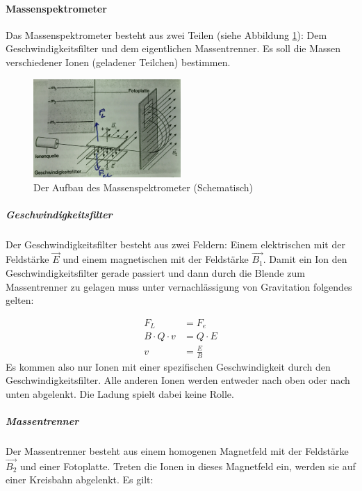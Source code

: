 \documentclass[a4paper]{article}
\begin{document}
		
			
			
			\paragraph{Massenspektrometer}
				Das Massenspektrometer besteht aus zwei Teilen (siehe Abbildung \ref{img:massenspektrometer}): Dem Geschwindigkeitsfilter und dem eigentlichen Massentrenner. Es soll die Massen verschiedener Ionen (geladener Teilchen) bestimmen.
				
				\begin{figure}[ht]
					\centering
					\includegraphics[width=0.5\textwidth]{img/massenspektrometer.jpg}
					\caption{Der Aufbau des Massenspektrometer (Schematisch)}
					\label{img:massenspektrometer}
				\end{figure}
				
				\subparagraph{Geschwindigkeitsfilter} Der Geschwindigkeitsfilter besteht aus zwei Feldern: Einem elektrischen mit der Feldstärke $\vec{E}$ und einem magnetischen mit der Feldstärke $\vec{B_1}$. Damit ein Ion den Geschwindigkeitsfilter gerade passiert und dann durch die Blende zum Massentrenner zu gelagen muss unter vernachlässigung von Gravitation folgendes gelten:
				
				\begin{equation}
				\begin{aligned} 
					F_L&=F_{e}\\
					B\cdot Q\cdot v &= Q \cdot E\\
					v&=\frac{E}{B}
				\end{aligned}
				\end{equation}
				Es kommen also nur Ionen mit einer spezifischen Geschwindigkeit durch den Geschwindigkeitsfilter. Alle anderen Ionen werden entweder nach oben oder nach unten abgelenkt. Die Ladung spielt dabei keine Rolle.
				
				\subparagraph{Massentrenner} Der Massentrenner besteht aus einem homogenen Magnetfeld mit der Feldstärke $\vec{B_2}$ und einer Fotoplatte. Treten die Ionen in dieses Magnetfeld ein, werden sie auf einer Kreisbahn abgelenkt. Es gilt:
				
\end{document}
